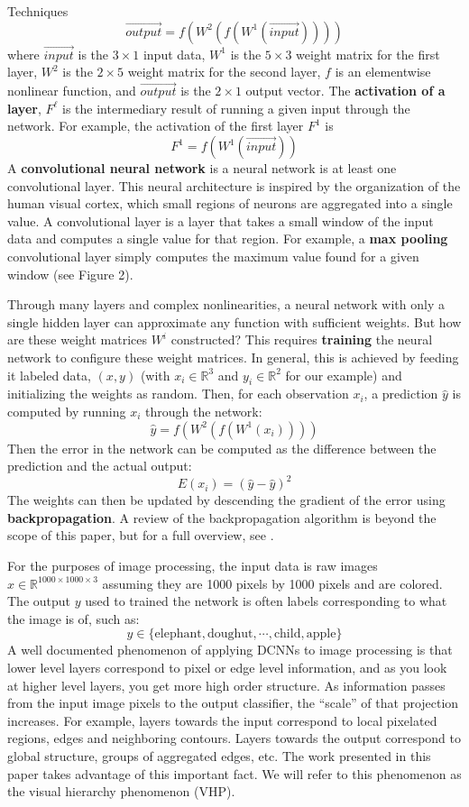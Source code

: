\documentclass[12pt]{pom_thesis}
\begin{document}
\begin{chapter}{Techniques}
$$\vec{output} = f(W^2(f(W^1(\vec{input}))))$$
where $\vec{input}$ is the $3 \times 1$ input data, $W^1$ is the $5 \times 3$ weight matrix for the first layer, $W^2$ is the $2 \times 5$ weight matrix for the second layer, $f$ is an elementwise nonlinear function, and $\vec{output}$ is the $2\times 1$ output vector. The \textbf{activation of a layer}, $F^\ell$ is the intermediary result of running a given input through the network. For example, the activation of the first layer $F^1$ is 
$$F^1= f(W^1(\vec{input}))$$
A \textbf{convolutional neural network} is a neural network is at least one convolutional layer. This neural architecture is inspired by the organization of the human visual cortex, which small regions of neurons are aggregated into a single value. A convolutional layer is a layer that takes a small window of the input data and computes a single value for that region. For example, a \textbf{max pooling} convolutional layer simply computes the maximum value found for a given window (see Figure 2).

Through many layers and complex nonlinearities, a neural network with only a single hidden layer can approximate any function \cite{hornik1991approximation} with sufficient weights. But how are these weight matrices $W^i$ constructed?  This requires \textbf{training} the neural network to configure these weight matrices. In general, this is achieved by feeding it labeled data, $(x,y)$ (with $x_i \in \mathbb{R}^3$ and $y_i \in \mathbb{R}^2$ for our example) and initializing the weights as random. Then, for each observation $x_i$, a prediction $\hat{y}$ is computed by running $x_i$ through the network:
$$\hat{y} = f(W^2(f(W^1(x_i))))$$
Then the error in the network can be computed as the difference between the prediction and the actual output:
$$E(x_i) = (\hat{y} - \hat{y})^2$$
The weights can then be updated by descending the gradient of the error using \textbf{backpropagation}.  A review of the backpropagation algorithm is beyond the scope of this paper, but for a full overview, see \cite{rumelhart1988learning}.

For the purposes of image processing, the input data is raw images $x \in \mathbb{R}^{1000 \times 1000 \times 3}$ assuming they are 1000 pixels by 1000 pixels and are colored. The output $y$ used to trained the network is often labels corresponding to what the image is of, such as: $$y \in \{\text{elephant}, \text{doughut}, \cdots, \text{child},\text{apple}  \}$$
A well documented phenomenon of applying DCNNs to image processing is that lower level layers correspond to pixel or edge level information, and as you look at higher level layers, you get more high order structure. As information passes from the input image pixels to the output classifier, the ``scale'' of that projection increases. For example, layers towards the input correspond to local pixelated regions, edges and neighboring contours. Layers towards the output correspond to global structure, groups of aggregated edges, etc.  The work presented in this paper takes advantage of this important fact.  We will refer to this phenomenon as the visual hierarchy phenomenon (VHP).

\end{chapter}
\end{document}
